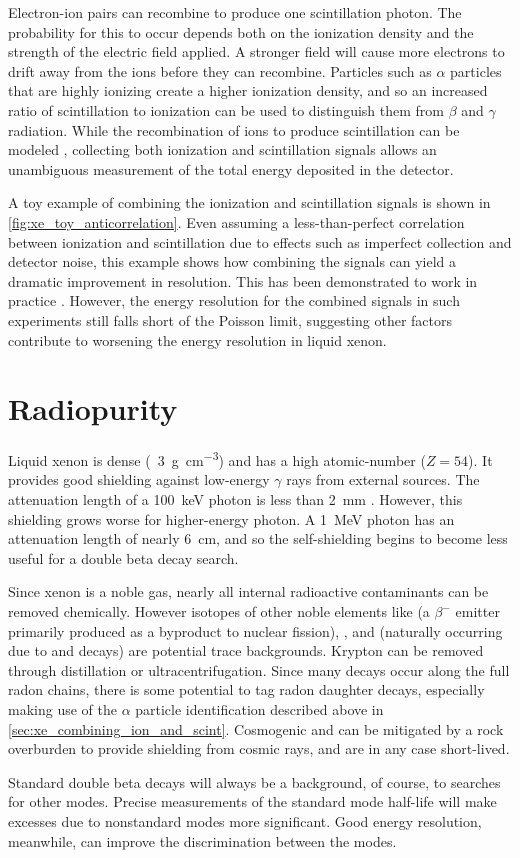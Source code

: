 \documentclass[herrin-thesis.tex]{subfiles}
\begin{document}
Electron-ion pairs can recombine to produce one scintillation photon. The probability for this to occur depends both on the ionization density and the strength of the electric field applied. A stronger field will cause more electrons to drift away from the ions before they can recombine. Particles such as \(\alpha\) particles that are highly ionizing create a higher ionization density, and so an increased ratio of scintillation to ionization can be used to distinguish them from \(\beta\) and \(\gamma\) radiation. While the recombination of ions to produce scintillation can be modeled \cite{Doke:1988qf,Thomas:1987ve}, collecting both ionization and scintillation signals allows an unambiguous measurement of the total energy deposited in the detector.

A toy example of combining the ionization and scintillation signals is shown in \cref{fig:xe_toy_anticorrelation}. Even assuming a less-than-perfect correlation between ionization and scintillation due to effects such as imperfect collection and detector noise, this example shows how combining the signals can yield a dramatic improvement in resolution. This has been demonstrated to work in practice \cite{Conti:2003tg,Aprile:2007hc}. However, the energy resolution for the combined signals in such experiments still falls short of the Poisson limit, suggesting other factors contribute to worsening the energy resolution in liquid xenon.

\section{Radiopurity}
Liquid xenon is dense (\about~\SI{3}{\g\per\cubic\cm}) and has a high atomic-number (\(Z=54\)). It provides good shielding against low-energy \(\gamma\) rays from external sources. The attenuation length of a \SI{100}{keV} photon is less than \SI{2}{\mm} \cite{Berger:2010dq}. However, this shielding grows worse for higher-energy photon. A \SI{1}{MeV} photon has an attenuation length of nearly \SI{6}{\cm}, and so the self-shielding begins to become less useful for a double beta decay search.

Since xenon is a noble gas, nearly all internal radioactive contaminants can be removed chemically. However isotopes of other noble elements like  (a \(\beta^{-}\) emitter primarily produced as a byproduct to nuclear fission), , and  (naturally occurring due to  and  decays) are potential trace backgrounds. Krypton can be removed through distillation or ultracentrifugation. Since many decays occur along the full radon chains, there is some potential to tag radon daughter decays, especially making use of the \(\alpha\) particle identification described above in \cref{sec:xe_combining_ion_and_scint}. Cosmogenic  and  can be mitigated by a rock overburden to provide shielding from cosmic rays, and are in any case short-lived.

Standard double beta decays will always be a background, of course, to searches for other modes. Precise measurements of the standard mode half-life will make excesses due to nonstandard modes more significant. Good energy resolution, meanwhile, can improve the discrimination between the modes.
\end{document}
